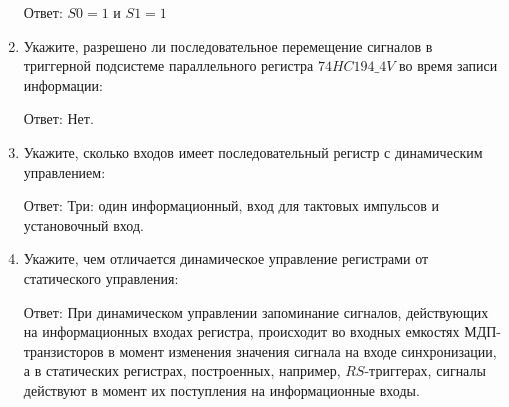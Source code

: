 \documentclass[spec, och, labwork]{shiza}
\begin{document}
\begin{enumerate}
    Ответ: $S0 = 1$ и $S1 = 1$

    \item Укажите, разрешено ли последовательное перемещение сигналов в триггерной подсистеме параллельного регистра $74HC194\_4V$ во время записи информации:
    
    Ответ: Нет.

    \item Укажите, сколько входов имеет последовательный регистр с динамическим управлением:
    
    Ответ: Три: один информационный, вход для тактовых импульсов и установочный вход.

    \item Укажите, чем отличается динамическое управление регистрами от статического управления:
    
    Ответ: При динамическом управлении запоминание сигналов, действующих на информационных входах регистра, происходит во входных емкостях МДП-транзисторов в момент изменения значения сигнала на входе синхронизации, а в статических регистрах, построенных, например, $RS$-триггерах, сигналы действуют в момент их поступления на информационные входы.
    
  \end{enumerate}
\end{document}
